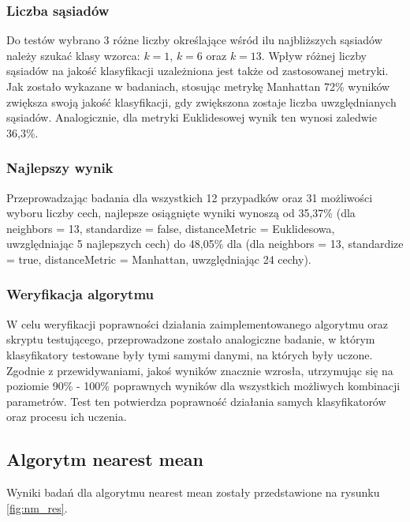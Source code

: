 \documentclass[11pt, a4paper, titlepage]{report}
\begin{document}
\subsubsection{Liczba sąsiadów}
\label{subs:Liczba sąsiadów}
Do testów wybrano 3 różne liczby określające wśród ilu najbliższych sąsiadów należy szukać klasy wzorca: $k=1$, $k=6$ oraz $k=13$.
Wpływ różnej liczby sąsiadów na jakość klasyfikacji uzależniona jest także od zastosowanej metryki. Jak zostało wykazane w badaniach, stosując metrykę Manhattan 72\% wyników zwiększa swoją jakość klasyfikacji, gdy zwiększona zostaje liczba uwzględnianych sąsiadów. Analogicznie, dla metryki Euklidesowej wynik ten wynosi zaledwie 36,3\%.

\subsubsection{Najlepszy wynik}
\label{subs:Najlepszy wynik}
Przeprowadzając badania dla wszystkich 12 przypadków oraz 31 możliwości wyboru liczby cech, najlepsze osiągnięte wyniki wynoszą od 35,37\%  (dla neighbors = 13, standardize = false, distanceMetric = Euklidesowa, uwzględniając 5 najlepszych cech) do 48,05\% dla  (dla neighbors = 13, standardize = true, distanceMetric = Manhattan, uwzględniając 24 cechy).

\subsubsection{Weryfikacja algorytmu}
\label{subs:Weryfikacja algorytmu}
W celu weryfikacji poprawności działania zaimplementowanego algorytmu oraz skryptu testującego, przeprowadzone zostało analogiczne badanie, w którym klasyfikatory testowane były tymi samymi danymi, na których były uczone. Zgodnie z przewidywaniami, jakoś wyników znacznie wzrosła, utrzymując się na poziomie 90\% - 100\% poprawnych wyników dla wszystkich możliwych kombinacji parametrów. Test ten potwierdza poprawność działania samych klasyfikatorów oraz procesu ich uczenia.
\newpage
\subsection{Algorytm nearest mean}
\label{subs:Algorytm nearest mean}
Wyniki badań dla algorytmu nearest mean zostały przedstawione na rysunku \ref{fig:nm_res}.
\end{document}

